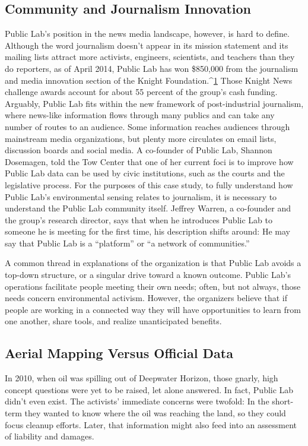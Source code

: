 \subsection{Community and Journalism Innovation}
Public Lab's position in the news media landscape, however, is hard to define.
Although the word journalism doesn't appear in its mission statement and
its mailing lists attract more activists, engineers, scientists, and teachers
than they do reporters, as of April 2014, Public Lab has won \$850,000 from
the journalism and media innovation section of the Knight Foundation.^{\href{#endnotes-public-lab}{1}}
Those Knight News challenge awards account for about 55 percent of the
group's cash funding. Arguably, Public Lab fits within the new framework of
post-industrial journalism, where news-like information flows through
many publics and can take any number of routes to an audience. Some information
reaches audiences through mainstream media organizations, but
plenty more circulates on email lists, discussion boards and social media. A
co-founder of Public Lab, Shannon Dosemagen, told the Tow Center that
one of her current foci is to improve how Public Lab data can be used by civic
institutions, such as the courts and the legislative process.
For the purposes of this case study, to fully understand how Public Lab's
environmental sensing relates to journalism, it is necessary to understand
the Public Lab community itself. Jeffrey Warren, a co-founder and
the group's research director, says that when he introduces Public Lab to
someone he is meeting for the first time, his description shifts around:
He may say that Public Lab is a ``platform'' or ``a network of communities.''

A common thread in explanations of the organization is that Public Lab
avoids a top-down structure, or a singular drive toward a known outcome.
Public Lab's operations facilitate people meeting their own needs; often,
but not always, those needs concern environmental activism. However,
the organizers believe that if people are working in a connected way they
will have opportunities to learn from one another, share tools, and realize
unanticipated benefits.

\subsection{Aerial Mapping Versus Official Data}
In 2010, when oil was spilling out of Deepwater Horizon, those gnarly, high
concept questions were yet to be raised, let alone answered. In fact, Public
Lab didn't even exist. The activists' immediate concerns were twofold: In
the short-term they wanted to know where the oil was reaching the land,
so they could focus cleanup efforts. Later, that information might also feed
into an assessment of liability and damages.

